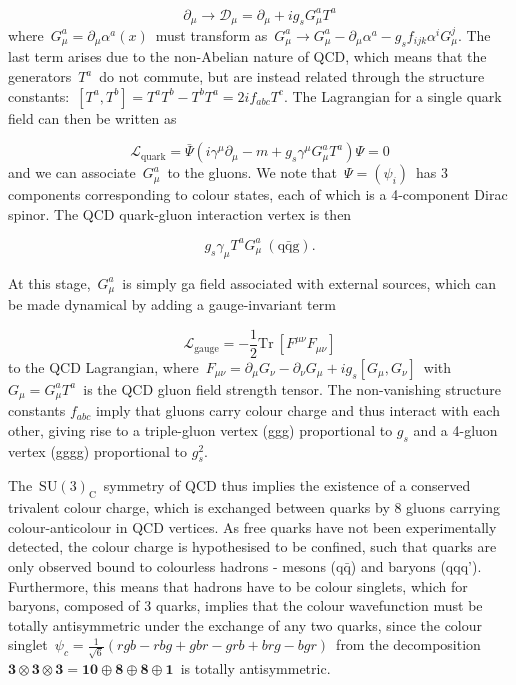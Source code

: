 \begin{equation}
\label{eq:theory_qcd_deriv}
\partial_\mu \rightarrow \mathcal{D}_\mu = \partial_\mu + i g_s G^a_\mu T^a
\end{equation}
where~$G^a_\mu = \partial_\mu \alpha^a(x)$~must transform as~$G^a_\mu \rightarrow G^a_\mu - \partial_\mu \alpha^a - g_s f_{ijk} \alpha^i G^j_\mu$. The last term arises due to the non-Abelian nature of QCD, which means that the generators~$T^a$~do not commute, but are instead related through the structure constants:~$[T^a, T^b] = T^a T^b - T^b T^a = 2 i f_{abc} T^c$. The Lagrangian for a single quark field can then be written as

\begin{equation}
\label{eq:theory_quark_lagrangian}
\mathcal{L}_{\mathrm{quark}} = \bar{\Psi} (i \gamma^\mu \partial_\mu - m + g_s \gamma^\mu G^a_\mu T^a) \Psi = 0
\end{equation}
and we can associate~$G^a_\mu$~to the gluons. We note that~$\Psi = (\psi_i)$~has 3 components corresponding to colour states, each of which is a 4-component Dirac spinor. The QCD quark-gluon interaction vertex is then

\begin{equation}
g_s \gamma_\mu T^a G^a_\mu~(\mathrm{q}\bar{\mathrm{q}}\mathrm{g}).
\end{equation}

At this stage,~$G^a_\mu$~is simply ga field associated with external sources, which can be made dynamical by adding a gauge-invariant term

\begin{equation}
\mathcal{L}_{\mathrm{gauge}} = - \frac{1}{2} \mathrm{Tr}\ [F^{\mu\nu} F_{\mu\nu}] 
\end{equation}
to the QCD Lagrangian, where~$F_{\mu\nu} = \partial_\mu G_\nu - \partial_\nu G_\mu + i g_s [G_\mu, G_\nu]$~with~$G_\mu = G_\mu^a T^a$~is the QCD gluon field strength tensor. The non-vanishing structure constants $f_{abc}$ imply that gluons carry colour charge and thus interact with each other, giving rise to a triple-gluon vertex (ggg) proportional to $g_s$ and a 4-gluon vertex (gggg) proportional to $g_s^2$.

The~$\mathrm{SU}(3)_{\mathrm{C}}$~symmetry of QCD thus implies the existence of a conserved trivalent colour charge, which is exchanged between quarks by 8 gluons carrying colour-anticolour in QCD vertices. As free quarks have not been experimentally detected, the colour charge is hypothesised to be confined, such that quarks are only observed bound to colourless hadrons - mesons ($\mathrm{q}\bar{\mathrm{q}}$) and baryons (qqq'). Furthermore, this means that hadrons have to be colour singlets, which for baryons, composed of 3 quarks, implies that the colour wavefunction must be totally antisymmetric under the exchange of any two quarks, since the colour  singlet~$\psi_c = \frac{1}{\sqrt{6}} (rgb - rbg + gbr - grb + brg - bgr)$~from the decomposition~$\mathbf{3}\otimes \mathbf{3} \otimes \mathbf{3} = \mathbf{10} \oplus \mathbf{8} \oplus \mathbf{8} \oplus \mathbf{1}$~is totally antisymmetric.

